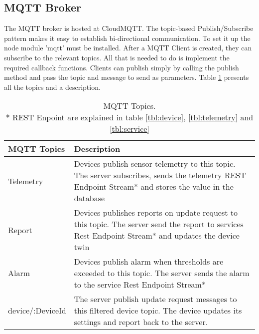 \subsection{MQTT Broker}

The MQTT broker is hosted at CloudMQTT. The topic-based Publish/Subscribe pattern makes it easy to establish bi-directional communication. To set it up the node module 'mqtt' must be installed. After a MQTT Client is created, they can subscribe to the relevant topics. All that is needed to do is implement the required callback functions. Clients can publish simply by calling the publish method and pass the topic and message to send as parameters. Table \ref{tbl:topics} presents all the topics and a description. 

\begin{table}[H]
    \centering
    \begin{tabular}{|l|p{10cm}|}
    \hline
    \textbf{MQTT Topics}    & \textbf{Description} \\ \hline
    Telemetry & Devices publish sensor telemetry to this topic. The server subscribes, sends the telemetry REST Endpoint Stream* and stores the value in the database \\ \hline
    Report & Devices publishes reports on update request to this topic. The server send the report to services Rest Endpoint Stream* and updates the device twin \\ \hline
    Alarm & Devices publish alarm when thresholds are exceeded to this topic. The server sends the alarm to the service Rest Endpoint Stream* \\ \hline
    device/:DeviceId & The server publish update request messages to this filtered device topic. The device updates its settings and report back to the server. \\ \hline
    \end{tabular}
    \caption{MQTT Topics.\\ * REST Enpoint are explained in table \ref{tbl:device}, \ref{tbl:telemetry} and \ref{tbl:service}}
    \label{tbl:topics}
\end{table}
